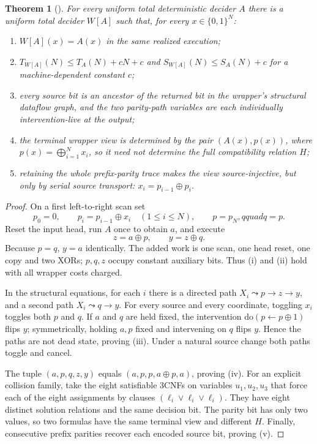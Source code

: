 \documentclass[11pt]{article}
\newtheorem{theorem}{Theorem}
\newcommand{\claim}[1]{\texttt{\detokenize{#1}}}
\begin{document}
\begin{theorem}[\claim{CAUSAL-LIVENESS-CANCELLATION1}]
For every uniform total deterministic decider $A$ there is a uniform total
decider $W[A]$ such that, for every $x\in\{0,1\}^N$:
\begin{enumerate}[label=(\roman*)]
\item $W[A](x)=A(x)$ in the same realized execution;
\item $T_{W[A]}(N)\le T_A(N)+cN+c$ and
      $S_{W[A]}(N)\le S_A(N)+c$ for a machine-dependent constant $c$;
\item every source bit is an ancestor of the returned bit in the wrapper's
      structural dataflow graph, and the two parity-path variables are each
      individually intervention-live at the output;
\item the terminal wrapper view is determined by the pair $(A(x),p(x))$,
      where $p(x)=\bigoplus_{i=1}^N x_i$, so it need not determine the full
      compatibility relation $H$;
\item retaining the whole prefix-parity trace makes the view source-injective,
      but only by serial source transport: $x_i=p_{i-1}\oplus p_i$.
\end{enumerate}
\end{theorem}

\begin{proof}
On a first left-to-right scan set
\[
 p_0=0,\qquad p_i=p_{i-1}\oplus x_i\quad(1\le i\le N),
 \qquad p=p_N,qquad q=p.
\]
Reset the input head, run $A$ once to obtain $a$, and execute
\[
 z=a\oplus p,\qquad y=z\oplus q.
\]
Because $p=q$, $y=a$ identically.  The added work is one scan, one head reset,
one copy and two XORs; $p,q,z$ occupy constant auxiliary bits.  Thus (i) and
(ii) hold with all wrapper costs charged.

In the structural equations, for each $i$ there is a directed path
$X_i\leadsto p\to z\to y$, and a second path
$X_i\leadsto q\to y$.  For every source and every coordinate, toggling $x_i$
toggles both $p$ and $q$.  If $a$ and $q$ are held fixed, the intervention
$\mathrm{do}(p\leftarrow p\oplus1)$ flips $y$; symmetrically, holding $a,p$
fixed and intervening on $q$ flips $y$.  Hence the paths are not dead state,
proving (iii).  Under a natural source change both paths toggle and cancel.

The tuple $(a,p,q,z,y)$ equals
$(a,p,p,a\oplus p,a)$, proving (iv).  For an explicit collision family,
take the eight satisfiable 3CNFs on variables $u_1,u_2,u_3$ that force each of
the eight assignments by clauses $(\ell_i\vee\ell_i\vee\ell_i)$.  They have
eight distinct solution relations and the same decision bit.  The parity bit
has only two values, so two formulas have the same terminal view and different
$H$.  Finally, consecutive prefix parities recover each encoded source bit,
proving (v).
\end{proof}
\end{document}
